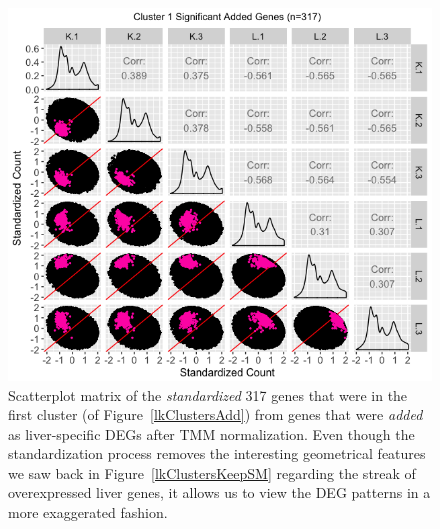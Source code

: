 \documentclass{article}
\begin{document}
\null
\begin{figure}[t!]
\centerline{\includegraphics[width=1\columnwidth]{../MakeFigures/lkClustersAddSM-St.jpg}}
\caption{Scatterplot matrix of the \textit{standardized} 317 genes that were in the first cluster (of Figure~\ref{lkClustersAdd}) from genes that were \textit{added} as liver-specific DEGs after TMM normalization. Even though the standardization process removes the interesting geometrical features we saw back in Figure~\ref{lkClustersKeepSM} regarding the streak of overexpressed liver genes, it allows us to view the DEG patterns in a more exaggerated fashion.
\label{lkClustersAddSM-St}}
\end{figure}
\end{document}
